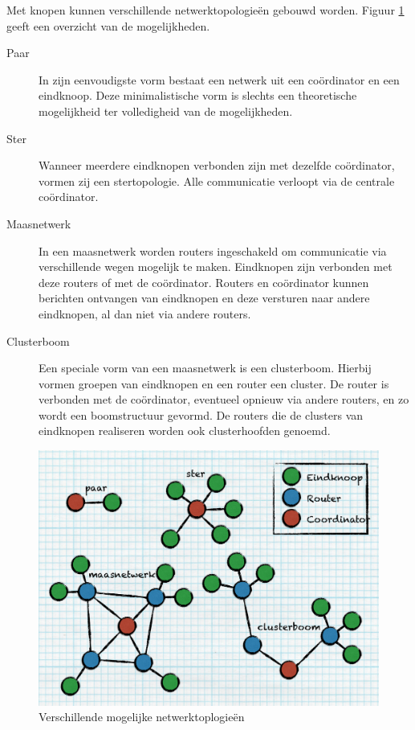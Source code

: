 Met knopen kunnen verschillende netwerktopologie\"en gebouwd worden. Figuur
\ref{fig:topologie} geeft een overzicht van de mogelijkheden.

\begin{description}

  \item[Paar] In zijn eenvoudigste vorm bestaat een netwerk uit een
  co\"ordinator en een eindknoop. Deze minimalistische vorm is slechts een
  theoretische mogelijkheid ter volledigheid van de mogelijkheden.
  
  \item[Ster] Wanneer meerdere eindknopen verbonden zijn met dezelfde
  co\"ordinator, vormen zij een stertopologie. Alle communicatie verloopt via
  de centrale co\"ordinator.
  
  \item[Maasnetwerk] In een maasnetwerk worden routers ingeschakeld om
  communicatie via verschillende wegen mogelijk te maken. Eindknopen zijn
  verbonden met deze routers of met de co\"ordinator. Routers en co\"ordinator
  kunnen berichten ontvangen van eindknopen en deze versturen naar andere
  eindknopen, al dan niet via andere routers.
  
  \item[Clusterboom] Een speciale vorm van een maasnetwerk is een clusterboom.
  Hierbij vormen groepen van eindknopen en een router een cluster. De router is
  verbonden met de co\"ordinator, eventueel opnieuw via andere routers, en zo
  wordt een boomstructuur gevormd. De routers die de clusters van eindknopen
  realiseren worden ook clusterhoofden genoemd.
  
\end{description}

\begin{figure}[ht]
  \centering
  \includegraphics[width=0.7\linewidth]{resources/topology.pdf}
  \caption{Verschillende mogelijke netwerktoplogie\"en}
  \label{fig:topologie}
\end{figure}

